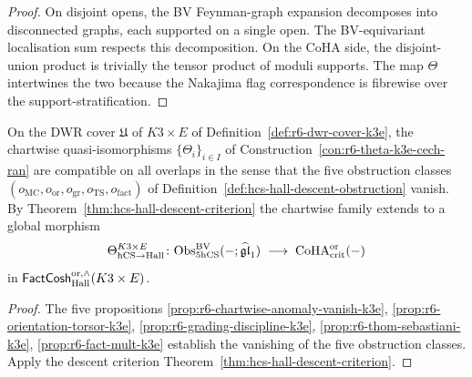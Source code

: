 \begin{proof}
On disjoint opens, the BV Feynman-graph expansion decomposes into
disconnected graphs, each supported on a single open. The
BV-equivariant localisation sum respects this decomposition. On the
CoHA side, the disjoint-union product is trivially the tensor product
of moduli supports. The map $\Theta$ intertwines the two because the
Nakajima flag correspondence is fibrewise over the support-stratification.
\end{proof}

\begin{theorem}
\label{thm:r6-k3e-local-chart-qiso}
On the DWR cover $\mathfrak U$ of $K3\times E$ of
Definition~\ref{def:r6-dwr-cover-k3e}, the chartwise
quasi-isomorphisms $\{\Theta_i\}_{i\in I}$ of
Construction~\ref{con:r6-theta-k3e-cech-ran} are compatible on all
overlaps in the sense that the five obstruction classes
$(o_{\mathrm{MC}}, o_{\mathrm{or}}, o_{\mathrm{gr}}, o_{\mathrm{TS}},
o_{\mathrm{fact}})$ of Definition~\ref{def:hcs-hall-descent-obstruction}
vanish. By Theorem~\ref{thm:hcs-hall-descent-criterion} the chartwise
family extends to a global morphism
\[
\Theta_{\mathrm{hCS}\to\mathrm{Hall}}^{K3\times E}\colon
\mathrm{Obs}^{\mathrm{BV}}_{5\mathrm{hCS}}(-;\widehat{\mathfrak{gl}}_1)
\;\longrightarrow\;
\mathrm{CoHA}^{\mathrm{or}}_{\mathrm{crit}}(-)
\]
in $\mathsf{FactCosh}_{\mathrm{Hall}}^{\mathrm{or},\wedge}(K3\times E)$.
\end{theorem}

\begin{proof}
The five propositions
\ref{prop:r6-chartwise-anomaly-vanish-k3e},
\ref{prop:r6-orientation-torsor-k3e},
\ref{prop:r6-grading-discipline-k3e},
\ref{prop:r6-thom-sebastiani-k3e},
\ref{prop:r6-fact-mult-k3e}
establish the vanishing of the five obstruction classes. Apply the
descent criterion Theorem~\ref{thm:hcs-hall-descent-criterion}.
\end{proof}

